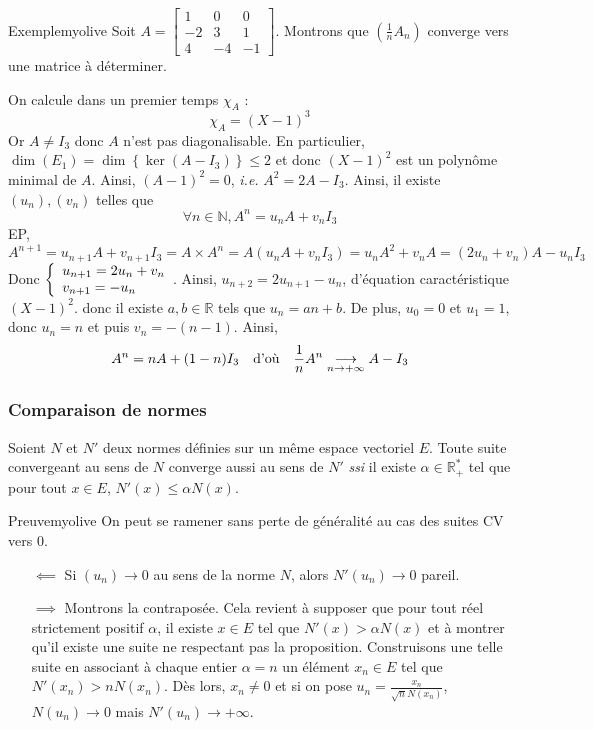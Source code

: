     \begin{omed}{Exemple}{myolive}
        Soit $A = \begin{bmatrix}
            1 & 0 & 0 \\
            -2 & 3 & 1 \\
            4 & -4 & -1
        \end{bmatrix}$. Montrons que $(\frac{1}{n} A_n)$ converge vers une matrice à déterminer. 

        On calcule dans un premier temps $\chi_A$ : 
        \[ \chi_A = (X - 1)^3 \]   
        Or $A \neq I_3$ donc $A$ n’est pas diagonalisable. En particulier, $\dim(E_1) = \dim\left\{\ker(A - I_3)\right\} \leq 2$ et donc $(X - 1)^2$ est un polynôme minimal de $A$. Ainsi, $(A - 1)^2 = 0$, \textit{i.e.} $A^2 = 2 A - I_3$. Ainsi, il existe $(u_n), (v_n)$ telles que 
        \[ \forall n \in \mathbb{N}, A^n = u_n A + v_n I_3 \]   
        EP, 
        \[ A^{n+1} = u_{n+1} A + v_{n+1} I_3 = A \times A^n = A(u_n A + v_n I_3) = u_n A^2 + v_n A = (2 u_n + v_n) A - u_n I_3 \]
        Donc $\et{u_{n+1} = 2 u_n + v_n}{v_{n+1} = - u_n}$. Ainsi, $u_{n+2} = 2 u_{n+1} - u_n$, d’équation caractéristique $(X - 1)^2$. donc il existe $a,b \in \mathbb{R}$ tels que $u_n = a n + b$. De plus, $u_0 = 0$ et $u_1 = 1$, donc $u_n = n$ et puis $v_n = -(n-1)$. Ainsi, 
        \[ A^n = n A + (1-n) I_3 \quad \text{d’où} \quad \frac{1}{n} A^n \underset{n \rightarrow +\infty}{\longrightarrow} A - I_3 \]
    \end{omed}

    \subsubsection{Comparaison de normes}

    \begin{prop}{}{}
        Soient $N$ et $N'$ deux normes définies sur un même espace vectoriel $E$. Toute suite convergeant au sens de $N$ converge aussi au sens de $N'$ \textit{ssi} il existe $\alpha \in \mathbb{R}_+^*$ tel que pour tout $x \in E$, $N'(x) \leq \alpha N(x)$.
    \end{prop}

    \begin{demo}{Preuve}{myolive}
        On peut se ramener sans perte de généralité au cas des suites CV vers $0$. 
        \begin{itemize}
            \item[$\impliedby$] Si $(u_n) \to 0$ au sens de la norme $N$, alors $N'(u_n) \to 0$ pareil.
            \item[$\implies$] Montrons la contraposée. Cela revient à supposer que pour tout réel strictement positif $\alpha$, il existe $x \in E$ tel que $N'(x) > \alpha N(x)$ et à montrer qu’il existe une suite ne respectant pas la proposition. Construisons une telle suite en associant à chaque entier $\alpha = n$ un élément $x_n \in E$ tel que $N'(x_n) > n N(x_n)$. Dès lors, $x_n \neq 0$ et si on pose $u_n = \frac{x_n}{\sqrt{n} N(x_n)}$, $N(u_n) \to 0$ mais $N'(u_n) \to +\infty$.
        \end{itemize}
    \end{demo}

